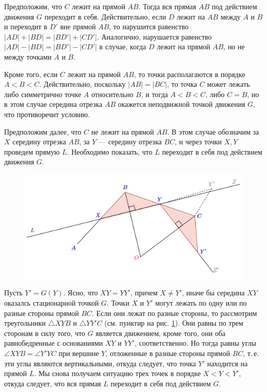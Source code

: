 \begin{enumerate}
Предположим, что $C$ лежит на прямой $AB$. Тогда вся прямая $AB$ под действием движения $G$ переходит в себя. Действительно, если $D$ лежит на $AB$ между $A$ и $B$ и переходит в $D'$ вне прямой $AB$, то нарушится равенство $|AD|+|BD|=|BD'|+|CD'|$. Аналогично, нарушается равенство $|AD|-|BD|=|BD'|-|CD'|$ в случае, когда $D$ лежит на прямой $AB$, но не между точками $A$ и $B$.

Кроме того, если $C$ лежит на прямой $AB$, то точки располагаются в порядке $A<B<C$. Действительно, поскольку $|AB|=|BC|$, то точка $C$ может лежать либо симметрично точке $A$ относительно $B$, и тогда $A<B<C$, либо $C=B$, но в этом случае середина отрезка $AB$ окажется неподвижной точкой движения $G$, что противоречит условию.

Предположим далее, что $C$ не лежит на прямой $AB$. В этом случае обозначим за $X$ середину отрезка $AB$, за $Y$ --- середину отрезка $BC$, и через точки $X,Y$ проведем прямую $L$. Необходимо показать, что $L$ переходит в себя под действием движения $G$.

\begin{figure}[hbt!]
\begin{center}
\includegraphics[scale=0.3]{Skolz.png}
\end{center}
\caption{}\label{ABCXYZ}
\end{figure}

Пусть $Y'=G(Y)$. Ясно, что $XY=YY'$, причем $X\ne Y'$, иначе бы середина $XY$ оказалсь стационарной точкой $G$. Точки $X$ и $Y'$ могут лежать по одну или по разные стороны прямой $BC$. Если они лежат по разные стороны, то рассмотрим треугольники $\triangle XYB$ и $\triangle YY'C$ (см. пунктир на рис. \ref{ABCXYZ}). Они равны по трем сторонам в силу того, что $G$ является движением, кроме того, они оба равнобедренные с основаниями $XY$ и $YY'$, соответственно. Но тогда равны углы $\angle XYB=\angle Y'YC$ при вершине $Y$, отложенные в разные стороны прямой $BC$, т.\,е. эти углы являются вертикальными, откуда следует, что точка $Y'$ находится на прямой $L$. Мы снова получаем ситуацию трех точек в порядке $X<Y<Y'$, откуда следует, что вся прямая $L$ переходит в себя под действием $G$.


\end{enumerate}
